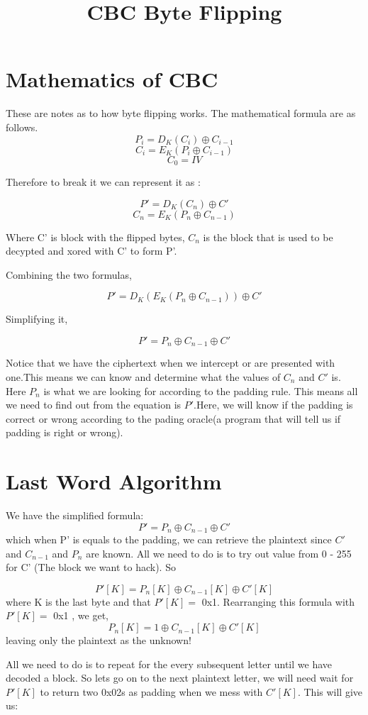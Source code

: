 \documentclass[12pt]{article}
\title{CBC Byte Flipping}
\begin{document}
\maketitle

\section{Mathematics of CBC}
These are notes as to how byte flipping works. The mathematical formula are as follows.
$$P_i = D_K(C_i)\oplus C_{i-1}$$
$$C_i = E_K(P_i \oplus C_{i-1})$$
$$C_0 = IV$$

Therefore to break it we can represent it as :

$$P' = D_K(C_n) \oplus C'$$
$$C_n = E_K(P_n \oplus C_{n-1})$$

Where C' is block with the flipped bytes, $C_n$ is the block that is used to be decypted and xored with C' to form P'.

Combining the two formulas,

$$P' = D_K(E_K(P_n\oplus C_{n-1}))\oplus C'$$

Simplifying it,

$$P' = P_n\oplus C_{n-1} \oplus C'$$

Notice that we have the ciphertext when we intercept or are presented with one.This means we can know and determine what the values of $C_n$ and  $C'$ is. Here $P_n$ is what we are looking for according to the padding rule. This means all we need to find out from the equation is $P'$.Here, we will know if the padding is correct or wrong according to the pading oracle(a program that will tell us if padding is right or wrong).
\newpage

\section{Last Word Algorithm}

We have the simplified formula:
$$P' = P_n\oplus C_{n-1} \oplus C'$$
which when P' is equals to the padding, we can retrieve the plaintext since $C'$ and $C_{n-1}$ and $P_n$ are known. All we need to do is to try out value from 0 - 255 for C' (The block we want to hack). So

$$P'[K] = P_n[K]\oplus C_{n-1}[K] \oplus C'[K]$$ where K is the last byte and that $P'[K] =$ 0x1. Rearranging this formula with $P'[K]=$ 0x1 , we get, $$P_n[K] = 1 \oplus C_{n-1}[K] \oplus C'[K]$$ leaving only the plaintext as the unknown!

All we need to do is to repeat for the every subsequent letter until we have decoded a block. So lets go on to the next plaintext letter, we will need wait for $P'[K]$ to return two 0x02s as padding when we mess with $C'[K]$. This will give us:
\end{document}
